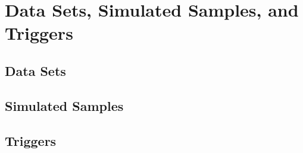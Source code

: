 \section{Data Sets, Simulated Samples, and Triggers}
\label{sec:datasets_simul_trig}

\subsection{Data Sets}

\subsection{Simulated Samples}
\label{subsec:sim_samples}

\subsection{Triggers}
\label{subsec:trig}
